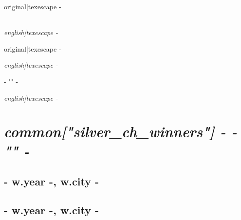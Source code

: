 {%

{%
{%
{\large {{ original|texescape -}} } 
{%
{%
{\normalsize{}}
\nopagebreak[3]\\{\itshape {{ english|texescape -}} }
{%
\begin{addmargin}[-0.05em]{0em}{\normalsize {{ original|texescape -}} }\end{addmargin}{\itshape {{ english|texescape -}} }
{%
\begin{addmargin}[-0.05em]{0em}{\normalsize{ {{- "}}" -}}\end{addmargin}{\itshape {{ english|texescape -}} }
{%
{\large{}}
{%
{%
{%

{%
{%
{%
{%
{%
{%
{%
{%
{%
{%

{%
\chapter*{\hfill{\slshape {{ common["silver_ch_winners"] -}} {{- "}}" -}}
\thispagestyle{empty}
\vspace{70pt}
{%
{%
    \section*{ {{- w.year -}}, {{ w.city -}} }
{%
    \section*{ {{- w.year -}}, {{ w.city -}} }
{%
{%
\begin{samepage}
    {%
}
\end{samepage}}}}}}}}}}}}}}}}}}}}}}}}}}}}
